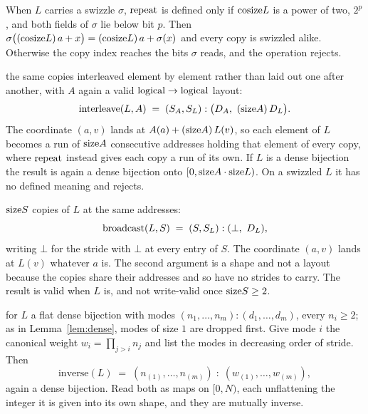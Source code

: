 \begin{description}
When $L$ carries a swizzle $\sigma$, $\mathrm{repeat}$ is defined only if $\mathrm{cosize} L$
is a power of two, $2^p$, and both fields of $\sigma$ lie below bit $p$. Then
$\sigma\big((\mathrm{cosize} L)\,a + x\big) = (\mathrm{cosize} L)\,a + \sigma(x)$ and every
copy is swizzled alike. Otherwise the copy index reaches the bits $\sigma$
reads, and the operation rejects.

\item[$\interleave(L, A)$] the same copies interleaved element by element
rather than laid out one after another, with $A$ again a valid
$\textrm{logical} \to \textrm{logical}$ layout:
\[
\mathrm{interleave}(L,A) \;=\; (S_A, S_L) \;{:}\; \big(D_A,\ (\mathrm{size} A)\,D_L\big).
\]
The coordinate $(a,v)$ lands at $A(a) + (\mathrm{size} A)\,L(v)$, so each element of
$L$ becomes a run of $\mathrm{size} A$ consecutive addresses holding that element of
every copy, where $\mathrm{repeat}$ instead gives each copy a run of its own. If $L$
is a dense bijection the result is again a dense bijection onto
$[0, \mathrm{size} A \cdot \mathrm{size} L)$. On a swizzled $L$ it has no defined meaning
and rejects.
\par\smallskip



\item[$\broadcast(L, S)$] $\mathrm{size} S$ copies of $L$ at the same addresses:
\[
\mathrm{broadcast}(L,S) \;=\; (S, S_L) \;{:}\; (\bot,\ D_L),
\]
writing $\bot$ for the stride with $\bot$ at every entry of $S$. The coordinate
$(a,v)$ lands at $L(v)$ whatever $a$ is. The second argument is a shape and not
a layout because the copies share their addresses and so have no strides to
carry. The result is valid when $L$ is, and not write-valid once
$\mathrm{size} S \ge 2$.
\par\smallskip



\item[$\mathrm{inverse}(L)$] for $L$ a flat dense bijection with modes
$(n_1,\dots,n_m){:}(d_1,\dots,d_m)$, every $n_i \ge 2$; as in
Lemma~\ref{lem:dense}, modes of size $1$ are dropped first. Give mode $i$ the canonical weight
$w_i = \prod_{j>i} n_j$ and list the modes in decreasing order of stride. Then
\[
\mathrm{inverse}(L) \;=\;
(n_{(1)},\dots,n_{(m)}) \;{:}\; (w_{(1)},\dots,w_{(m)}),
\]
again a dense bijection. Read both as maps on $[0,N)$, each unflattening the
integer it is given into its own shape, and they are mutually inverse.
\par\smallskip


\end{description}
